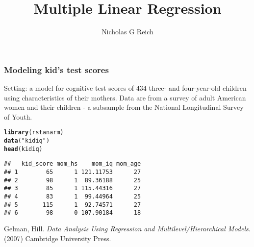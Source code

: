 \documentclass[table]{beamer}\usepackage[]{graphicx}\usepackage[]{color}
\title{Multiple Linear Regression}
\author{Nicholas G Reich}
\makeatletter
\newcommand{\hlstr}[1]{\textcolor[rgb]{0.192,0.494,0.8}{#1}}%
\newcommand{\hlstd}[1]{\textcolor[rgb]{0.345,0.345,0.345}{#1}}%
\newcommand{\hlkwd}[1]{\textcolor[rgb]{0.737,0.353,0.396}{\textbf{#1}}}%
\newenvironment{kframe}{%
 \def\at@end@of@kframe{}%
 \ifinner\ifhmode%
  \def\at@end@of@kframe{\end{minipage}}%
  \begin{minipage}{\columnwidth}%
 \fi\fi%
 \def\FrameCommand##1{\hskip\@totalleftmargin \hskip-\fboxsep
 \colorbox{shadecolor}{##1}\hskip-\fboxsep
     \hskip-\linewidth \hskip-\@totalleftmargin \hskip\columnwidth}%
 \MakeFramed {\advance\hsize-\width
   \@totalleftmargin\z@ \linewidth\hsize
   \@setminipage}}%
 {\par\unskip\endMakeFramed%
 \at@end@of@kframe}
\newenvironment{knitrout}{}{} %
\makeatother
\begin{document}
\begin{frame}[plain]
	\titlepage
\end{frame}










\begin{frame}[fragile]
\frametitle{Modeling kid's test scores}

Setting: a model for cognitive test scores of 434 three- and four-year-old children using characteristics of their mothers. Data are from a survey of adult American women and their children - a subsample from the National Longitudinal Survey of Youth.


\begin{knitrout}
\color{fgcolor}\begin{kframe}
\begin{alltt}
\hlkwd{library}\hlstd{(rstanarm)}
\hlkwd{data}\hlstd{(}\hlstr{"kidiq"}\hlstd{)}
\hlkwd{head}\hlstd{(kidiq)}
\end{alltt}
\begin{verbatim}
##   kid_score mom_hs    mom_iq mom_age
## 1        65      1 121.11753      27
## 2        98      1  89.36188      25
## 3        85      1 115.44316      27
## 4        83      1  99.44964      25
## 5       115      1  92.74571      27
## 6        98      0 107.90184      18
\end{verbatim}
\end{kframe}
\end{knitrout}

\vfill

{\tiny Gelman, Hill. \textit{Data Analysis Using Regression and Multilevel/Hierarchical Models}. (2007) Cambridge University Press.}

\end{frame}
\end{document}

